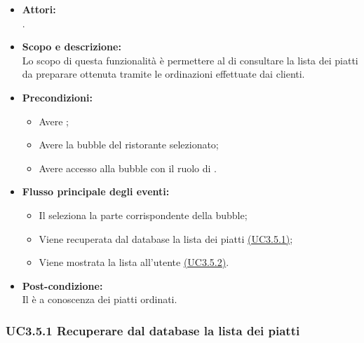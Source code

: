 \begin{itemize}
	\item \textbf{Attori:}
	\\.
	\item \textbf{Scopo e descrizione:} 
	\\Lo scopo di questa funzionalità è permettere al  di consultare la lista dei piatti da preparare ottenuta tramite le ordinazioni effettuate dai clienti.
	\item \textbf{Precondizioni:}
	\begin{itemize}
		\item Avere ;
		\item Avere la bubble del ristorante selezionato;
		\item Avere accesso alla bubble con il ruolo di .
	\end{itemize}
	\item \textbf{Flusso principale degli eventi:}
	\begin{itemize}
		\item Il  seleziona la parte corrispondente della bubble;
		\item Viene recuperata dal database la lista dei piatti \hyperref[UC3.5.1]{(UC3.5.1)};
		\item Viene mostrata la lista all’utente \hyperref[UC3.5.2]{(UC3.5.2)}.
	\end{itemize}
	\item \textbf{Post-condizione:}
	\\Il {} è a conoscenza dei piatti ordinati.
\end{itemize}

\subsubsection{UC3.5.1 Recuperare dal database la lista dei piatti} \label{UC3.5.1}

